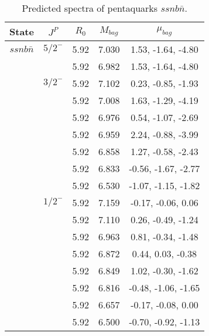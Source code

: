 \documentclass[prd,twocolumn,floatfix,nofootinbib]{revtex4}
\begin{document}
\renewcommand{\tabcolsep}{0.5cm}
\renewcommand{\arraystretch}{1.2}
\begin{table*}[!htbp]
    \caption{Predicted spectra of pentaquarks $ssnb\bar{n}$.}
    \begin{tabular}{ccccc}
        \hline\hline
        {\rm State} &$J^{P}$ &$R_{0}$ &$M_{bag}$ &$\mu_{bag}$ \\ \hline
        $ssnb\bar{n}$
            &${5/2}^{-}$    &5.92   &7.030  &1.53, -1.64, -4.80 \\
            &               &5.92   &6.982  &1.53, -1.64, -4.80 \\
            &${3/2}^{-}$    &5.92   &7.102  &0.23, -0.85, -1.93 \\
            &               &5.92   &7.008  &1.63, -1.29, -4.19 \\
            &               &5.92   &6.976  &0.54, -1.07, -2.69 \\
            &               &5.92   &6.959  &2.24, -0.88, -3.99 \\
            &               &5.92   &6.858  &1.27, -0.58, -2.43 \\
            &               &5.92   &6.833  &-0.56, -1.67, -2.77 \\
            &               &5.92   &6.530  &-1.07, -1.15, -1.82 \\
            &${1/2}^{-}$    &5.92   &7.159  &-0.17, -0.06, 0.06 \\
            &               &5.92   &7.110  &0.26, -0.49, -1.24 \\
            &               &5.92   &6.963  &0.81, -0.34, -1.48 \\
            &               &5.92   &6.872  &0.44, 0.03, -0.38 \\
            &               &5.92   &6.849  &1.02, -0.30, -1.62 \\
            &               &5.92   &6.816  &-0.48, -1.06, -1.65 \\
            &               &5.92   &6.657  &-0.17, -0.08, 0.00 \\
            &               &5.92   &6.500  &-0.70, -0.92, -1.13 \\
        \hline\hline
    \end{tabular}
\end{table*}
\end{document}

